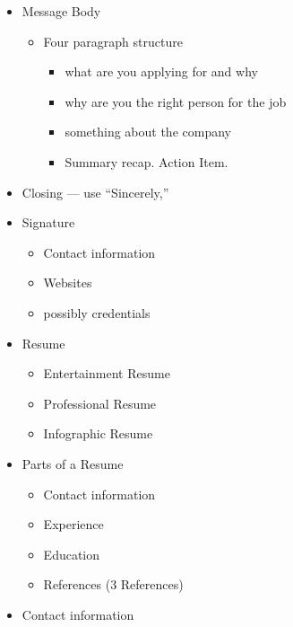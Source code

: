 \documentclass[12pt]{article}
\begin{document}
\begin{itemize}
                \item Message Body
                \begin{itemize}
                    \item Four paragraph structure
                    \begin{itemize}
                        \item what are you applying for and why
                        \item why are you the right person for the job
                        \item something about the company
                        \item Summary recap. Action Item.
                    \end{itemize}
                \end{itemize}
                \item Closing --- use ``Sincerely,''
                \item Signature
                \begin{itemize}
                    \item Contact information
                    \item Websites
                    \item possibly credentials
                \end{itemize}
                \item Resume
                \begin{itemize}
                    \item Entertainment Resume
                    \item Professional Resume
                    \item Infographic Resume
                \end{itemize}
                \item Parts of a Resume
                \begin{itemize}
                    \item Contact information
                    \item Experience
                    \item Education
                    \item References (3 References)
                \end{itemize}
                \item Contact information
                \begin{itemize}

\end{itemize}
\end{itemize}
\end{document}
